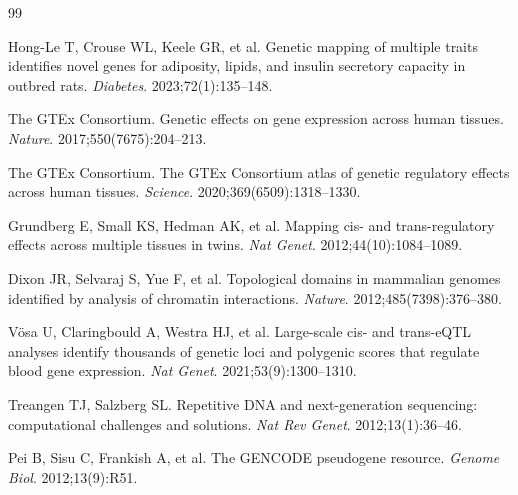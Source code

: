 \documentclass[11pt,a4paper]{article}
\begin{document}
\begin{thebibliography}{99}

Hong-Le T, Crouse WL, Keele GR, et al.
Genetic mapping of multiple traits identifies novel genes for adiposity, lipids, and insulin secretory capacity in outbred rats.
\textit{Diabetes}. 2023;72(1):135--148.

The GTEx Consortium.
Genetic effects on gene expression across human tissues.
\textit{Nature}. 2017;550(7675):204--213.

The GTEx Consortium.
The GTEx Consortium atlas of genetic regulatory effects across human tissues.
\textit{Science}. 2020;369(6509):1318--1330.

Grundberg E, Small KS, Hedman AK, et al.
Mapping cis- and trans-regulatory effects across multiple tissues in twins.
\textit{Nat Genet}. 2012;44(10):1084--1089.

Dixon JR, Selvaraj S, Yue F, et al.
Topological domains in mammalian genomes identified by analysis of chromatin interactions.
\textit{Nature}. 2012;485(7398):376--380.

V{\"o}sa U, Claringbould A, Westra HJ, et al.
Large-scale cis- and trans-eQTL analyses identify thousands of genetic loci and polygenic scores that regulate blood gene expression.
\textit{Nat Genet}. 2021;53(9):1300--1310.

Treangen TJ, Salzberg SL.
Repetitive DNA and next-generation sequencing: computational challenges and solutions.
\textit{Nat Rev Genet}. 2012;13(1):36--46.

Pei B, Sisu C, Frankish A, et al.
The GENCODE pseudogene resource.
\textit{Genome Biol}. 2012;13(9):R51.

\end{thebibliography}
\end{document}
